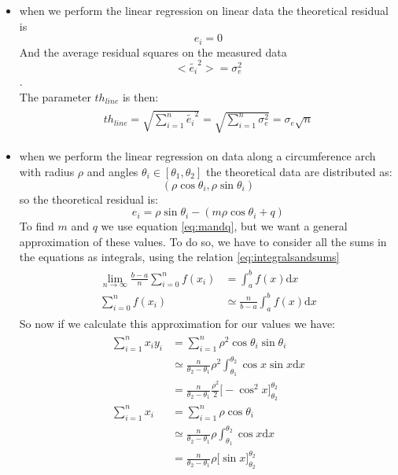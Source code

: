 \begin{itemize}
\begin{itemize}
\item when we perform the linear regression on linear data the theoretical residual is 
$$e_i = 0$$
And the average residual squares on the measured data $$<\tilde{e_i}^2>  = \sigma_e^2$$. \\
The parameter $th_{line}$ is then:
\begin{align}
\begin{split}
th_{line} = \sqrt{\sum_{i=1}^{n}{\tilde{e_i}^2}} = \sqrt{\sum_{i=1}^{n}{\sigma_e^2}} = \sigma_e\sqrt{n}
\end{split}
\end{align}
\item when we perform the linear regression on data along a circumference arch with radius $\rho$ and angles $\theta_i \in [\theta_1,\theta_2]$ the theoretical data are distributed as:
$$(\rho\cos{\theta_i},\rho\sin{\theta_i})$$ 
so the theoretical residual is:
$$e_i = \rho\sin{\theta_i} - (m\rho\cos{\theta_i} + q)$$
To find $m$ and $q$ we use equation \ref{eq:mandq}, but we want a general approximation of these values. To do so, we have  to consider all the sums in the equations as integrals, using the relation \ref{eq:integralsandsums}
\begin{align}
\begin{split}
\lim_{n \to \infty} { \frac{b-a}{n} \sum_{i=0}^{n}{f(x_i)}} &=   \int_a^b{f(x )\mathrm  {d}x} \\[10pt]
 \sum_{i=0}^{n}{f(x_i)} &\simeq \frac{n}{b-a} \int_a^b{f(x )\mathrm  {d}x}
\end{split}
\label{eq:integralsandsums}
\end{align} 
So now if we calculate this approximation for our values we have:
\begin{align}
\begin{split}
\sum_{i=1}^{n}{x_iy_i} &= \sum_{i=1}^{n}{\rho^2\cos{\theta_i}\sin{\theta_i}} \\
& \simeq  \frac{n}{\theta_2 - \theta_1}  \rho^2 \int_{\theta_1}^{\theta_2}{\cos{x}\sin{x} \mathrm  {d}x} \\
&=  \frac{n}{\theta_2 - \theta_1}  \frac{ \rho^2}{2} \Big[-\cos^2{x} \Big]_{\theta_2}^{\theta_2} \\[10pt]
 \sum_{i=1}^{n}{x_i} &= \sum_{i=1}^{n}{\rho\cos{\theta_i}} \\
&\simeq  \frac{n}{\theta_2 - \theta_1}  \rho \int_{\theta_1}^{\theta_2}{\cos{x}\mathrm  {d}x} \\
&= \frac{n}{\theta_2 - \theta_1}  \rho \Big[\sin{x} \Big]_{\theta_2}^{\theta_2}\\[10pt]

\end{split}
\end{align}
\end{itemize}
\end{itemize}
